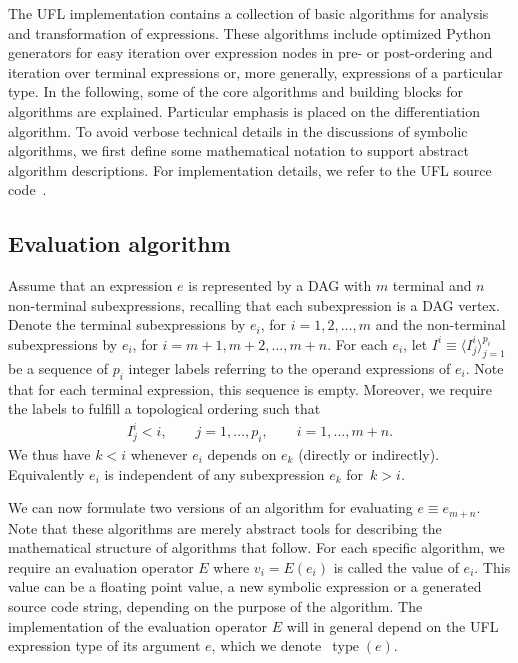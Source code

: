 \documentclass[prodmode,acmtoms]{acmsmall}
\newcommand{\type}{\operatorname{type}}
\begin{document}
The UFL implementation contains a collection of basic algorithms for
analysis and transformation of expressions. These algorithms include
optimized Python generators for easy iteration over expression nodes
in pre- or post-ordering and iteration over terminal expressions or,
more generally, expressions of a particular type. In the following,
some of the core algorithms and building blocks for algorithms are
explained. Particular emphasis is placed on the differentiation
algorithm. To avoid verbose technical details in the discussions of
symbolic algorithms, we first define some mathematical notation to
support abstract algorithm descriptions. For implementation details,
we refer to the UFL source code~\citep{ufl:www}.

\subsection{Evaluation algorithm}

Assume that an expression $e$ is represented by a DAG with $m$
terminal and $n$ non-terminal subexpressions, recalling that each
subexpression is a DAG vertex. Denote the terminal subexpressions by $e_i$, for
$i = 1, 2, \ldots, m$ and the non-terminal subexpressions by $e_i$, for
$i = m + 1, m + 2, \ldots, m + n$. For each $e_i$, let $I^i \equiv \langle I^i_j
\rangle_{j=1}^{p_i}$ be a sequence of $p_i$ integer labels referring
to the operand expressions of $e_i$. Note that for each terminal
expression, this sequence is empty. Moreover, we require the labels to
fulfill a topological ordering such that
\begin{align}
  I^i_j < i, \qquad j = 1, \ldots, p_i, \qquad i = 1,
  \ldots, m+n.
\end{align}
We thus have $k < i$ whenever $e_i$ depends on $e_k$ (directly or indirectly).
Equivalently $e_i$ is independent of any subexpression $e_k$ for~$k > i$.

We can now formulate two versions of an algorithm for evaluating $e
\equiv e_{m+n}$.  Note that these algorithms are merely abstract tools
for describing the mathematical structure of algorithms that follow.
For each specific algorithm, we require an evaluation operator $E$
where $v_i = E(e_i)$ is called the value of $e_i$. This value can be a
floating point value, a new symbolic expression or a generated source
code string, depending on the purpose of the algorithm. The
implementation of the evaluation operator $E$ will in general depend
on the UFL expression type of its argument $e$, which we denote~$\type(e)$.
\end{document}
